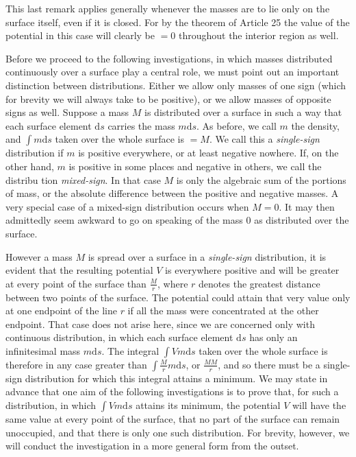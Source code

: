 This last remark applies generally whenever the masses are to lie only on the surface itself, even if it is closed. For by the theorem of Article 25 the value of the potential in this case will clearly be $=0$ throughout the interior region as well.

Before we proceed to the following investigations, in which masses distributed continuously over a surface play a central role, we must point out an important distinction between distributions. Either we allow only masses of one sign (which for brevity we will always take to be positive), or we allow masses of opposite signs as well. Suppose a mass $M$ is distributed over a surface in such a way that each surface element $\mathrm ds$ carries the mass $m\mathrm ds$. As before, we call $m$ the density, and $\int m\mathrm ds$ taken over the whole surface is $=M$. We call this a \textit{single-sign} distribution if $m$ is positive everywhere, or at least negative nowhere. If, on the other hand, $m$ is positive in some places and negative in others, we call the distribu%
%
tion \textit{mixed-sign}. In that case $M$ is only the algebraic sum of the portions of mass, or the absolute difference between the positive and negative masses. A very special case of a mixed-sign distribution occurs when $M=0$. It may then admittedly seem awkward to go on speaking of the mass $0$ as distributed over the surface.

However a mass $M$ is spread over a surface in a \textit{single-sign} distribution, it is evident that the resulting potential $V$ is everywhere positive and will be greater at every point of the surface than $\frac{M}{r}$, where $r$ denotes the greatest distance between two points of the surface. The potential could attain that very value only at one endpoint of the line $r$ if all the mass were concentrated at the other endpoint. That case does not arise here, since we are concerned only with continuous distribution, in which each surface element $\mathrm ds$ has only an infinitesimal mass $m\mathrm ds$. The integral $\int Vm\mathrm ds$ taken over the whole surface is therefore in any case greater than $\int\frac{M}{r}m\mathrm ds$, or $\frac{MM}{r}$, and so there must be a single-sign distribution for which this integral attains a minimum. We may state in advance that one aim of the following investigations is to prove that, for such a distribution, in which $\int Vm\mathrm ds$ attains its minimum, the potential $V$ will have the same value at every point of the surface, that no part of the surface can remain unoccupied, and that there is only one such distribution. For brevity, however, we will conduct the investigation in a more general form from the outset.

